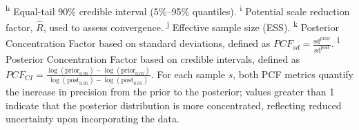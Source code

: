 \documentclass[12pt]{article}
\begin{document}
\begin{table}[h!]
{	\textsuperscript{h} Equal-tail 90\% credible interval (5\%–95\% quantiles). 
	\textsuperscript{i} Potential scale reduction factor, \(\ensuremath{\hat{R}}\), used to assess convergence. 
	\textsuperscript{j} Effective sample size (ESS). 
	\textsuperscript{k} Posterior Concentration Factor based on standard deviations, defined as 
	\(\ensuremath{PCF_{sd} = \frac{\text{sd}^{\text{prior}}}{\text{sd}^{\text{post}}}}\).
	\textsuperscript{l} Posterior Concentration Factor based on credible intervals, defined as  
	\(\ensuremath{PCF_{CI} = \frac{\log(\text{prior}_{0.95})-\log(\text{prior}_{0.05})}{\log(\text{post}_{0.95})-\log(\text{post}_{0.05})}}\).
	For each sample \(s\), both PCF metrics quantify the increase in precision from the prior to the posterior; values greater than 1 indicate that the posterior distribution is more concentrated, reflecting reduced uncertainty upon incorporating the data.}
		\label{table2}
	\end{table}
	
	
	
	
	
	
	
\end{document}
